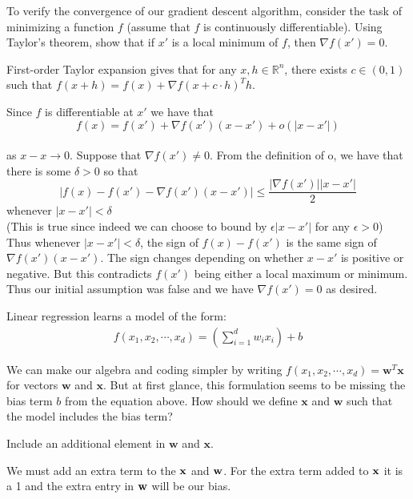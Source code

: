 \begin{problem}[3]
    To verify the convergence of our gradient descent algorithm, consider the task of minimizing a function $f$ (assume that $f$ is continuously differentiable). Using Taylor's theorem, show that if $x'$ is a local minimum of $f$, then $\nabla f(x') = 0$. 
\end{problem}
\begin{hint}
  First-order Taylor expansion gives that for any $x, h \in \mathbb{R}^n$, there exists $c \in (0, 1)$ such that $f(x + h) = f(x) + \nabla f(x + c\cdot h)^T h$.
  
\end{hint}
\begin{solution}
Since $f$ is differentiable at $x'$ we have that\\
$$f(x) = f(x') + \nabla f(x')(x-x') + o(|x-x'|)$$\\
as $x - x \rightarrow 0.$ Suppose that $\nabla f(x') \neq 0$. From the definition of o, we have that there is some $\delta > 0 $ so that\\
$$|f(x) - f(x') - \nabla f(x')(x-x')| \leq \frac{|\nabla f(x')||x-x'|}{2}$$ whenever $|x - x'| < \delta$\\
(This is true since indeed we can choose \delta to bound by $\epsilon|x - x'|$ for any $\epsilon > 0$) Thus whenever  $|x - x'| < \delta$, the sign of $f(x) - f(x')$ is the same sign of $\nabla f(x')(x-x')$. The sign changes depending on whether $x-x'$ is positive or negative. But this contradicts $f(x')$ being either a local maximum or minimum. Thus our initial assumption was false and we have $\nabla f(x') = 0$ as desired. 
\end{solution}

Linear regression learns a model of the form:
\begin{align*}
  f(x_1, x_2, \cdots, x_d) = \left(\sum_{i=1}^d w_i x_i\right) + b
\end{align*}

\begin{problem}[1]
  We can make our algebra and coding simpler by writing $f(x_1, x_2, \cdots, x_d) = \mathbf{w}^T\mathbf{x}$ for vectors $\mathbf{w}$ and $\mathbf{x}$.  But at first glance, this formulation seems to be missing the bias term $b$ from the equation above.  How should we define $\mathbf{x}$ and $\mathbf{w}$ such that the model includes the bias term?
\end{problem}
\begin{hint}
  Include an additional element in $\mathbf{w}$ and $\mathbf{x}$.
\end{hint}
\begin{solution}
  We must add an extra term to the $\bold{x}$ and $\bold{w}$. For the extra term added to $\bold{x}$ it is a 1 and the extra entry in $\bold{w}$ will be our bias.
\end{solution}

